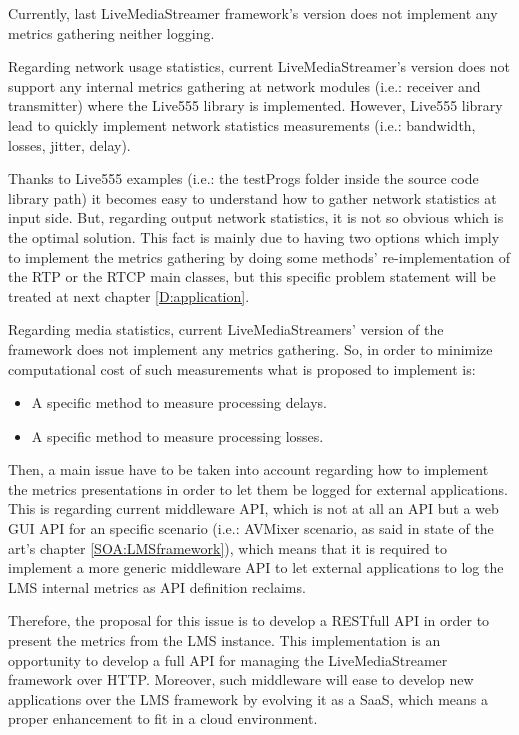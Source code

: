 Currently, last LiveMediaStreamer framework's version does not implement any metrics gathering neither logging.

Regarding network usage statistics, current LiveMediaStreamer's version does not support any internal metrics gathering at network modules (i.e.: receiver and transmitter) where the Live555 library is implemented. However, Live555 library lead to quickly implement network statistics measurements (i.e.: bandwidth, losses, jitter, delay). 

Thanks to Live555 examples (i.e.: the testProgs folder inside the source code library path) it becomes easy to understand how to gather network statistics at input side. But, regarding output network statistics, it is not so obvious which is the optimal solution. This fact is mainly due to having two options which imply to implement the metrics gathering by doing some methods' re-implementation of the RTP or the RTCP main classes, but this specific problem statement will be treated at next chapter \ref{D:application}.

Regarding media statistics, current LiveMediaStreamers' version of the framework does not implement any metrics gathering. So, in order to minimize computational cost of such measurements what is proposed to implement is:

\begin{itemize}
\item A specific method to measure processing delays.
\item A specific method to measure processing losses.
\end{itemize}

Then, a main issue have to be taken into account regarding how to implement the metrics presentations in order to let them be logged for external applications. This is regarding current middleware API, which is not at all an API but a web GUI API for an specific scenario (i.e.: AVMixer scenario, as said in state of the art's chapter \ref{SOA:LMSframework}), which means that it is required to implement a more generic middleware API to let external applications to log the LMS internal metrics as API definition reclaims. 

Therefore, the proposal for this issue is to develop a RESTfull API in order to present the metrics from the LMS instance. This implementation is an opportunity to develop a full API for managing the LiveMediaStreamer framework over HTTP.  Moreover, such middleware will ease to develop new applications over the LMS framework by evolving it as a SaaS, which means a proper enhancement to fit in a cloud environment. 

